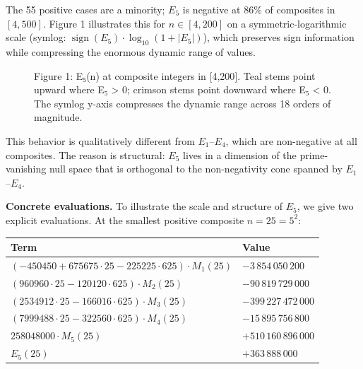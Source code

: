 \documentclass[
  11pt,
]{article}
\makeatletter
\newcounter{none} %
\newcommand*\pandocbounded[1]{%
  \sbox\pandoc@box{#1}%
  \Gscale@div\@tempa{\textheight}{\dimexpr\ht\pandoc@box+\dp\pandoc@box\relax}%
  \Gscale@div\@tempb{\linewidth}{\wd\pandoc@box}%
  \ifdim\@tempb\p@<\@tempa\p@\let\@tempa\@tempb\fi%
  \ifdim\@tempa\p@<\p@\scalebox{\@tempa}{\usebox\pandoc@box}%
  \else\usebox{\pandoc@box}%
  \fi%
}
\makeatother
\begin{document}
The 55 positive cases are a minority; \(E_5\) is negative at 86\% of
composites in \([4,500]\). Figure 1 illustrates this for
\(n \in [4,200]\) on a symmetric-logarithmic scale (symlog:
\(\operatorname{sign}(E_5)\cdot\log_{10}(1+|E_5|)\)), which preserves
sign information while compressing the enormous dynamic range of values.

\begin{figure}
\centering
\pandocbounded{\includegraphics[keepaspectratio,alt={Figure 1: E₅(n) at composite integers in {[}4,200{]}. Teal stems point upward where E₅ \textgreater{} 0; crimson stems point downward where E₅ \textless{} 0. The symlog y-axis compresses the dynamic range across 18 orders of magnitude.}]{e5_scatter.png}}
\caption{Figure 1: E₅(n) at composite integers in {[}4,200{]}. Teal
stems point upward where E₅ \textgreater{} 0; crimson stems point
downward where E₅ \textless{} 0. The symlog y-axis compresses the
dynamic range across 18 orders of magnitude.}
\end{figure}

This behavior is qualitatively different from \(E_1\)--\(E_4\), which
are non-negative at all composites. The reason is structural: \(E_5\)
lives in a dimension of the prime-vanishing null space that is
orthogonal to the non-negativity cone spanned by \(E_1\)--\(E_4\).

\textbf{Concrete evaluations.} To illustrate the scale and structure of
\(E_5\), we give two explicit evaluations. At the smallest positive
composite \(n = 25 = 5^2\):

{\def\LTcaptype{none} %
\begin{longtable}[]{@{}
  >{\raggedright\arraybackslash}p{}
  >{\raggedright\arraybackslash}p{}@{}}
\toprule\noalign{}
\begin{minipage}[b]{\linewidth}\raggedright
Term
\end{minipage} & \begin{minipage}[b]{\linewidth}\raggedright
Value
\end{minipage} \\
\midrule\noalign{}
\endhead
\bottomrule\noalign{}
\endlastfoot
\((-450450 + 675675 \cdot 25 - 225225 \cdot 625) \cdot M_1(25)\) &
\(-3\,854\,050\,200\) \\
\((960960 \cdot 25 - 120120 \cdot 625) \cdot M_2(25)\) &
\(-90\,819\,729\,000\) \\
\((2534912 \cdot 25 - 166016 \cdot 625) \cdot M_3(25)\) &
\(-399\,227\,472\,000\) \\
\((7999488 \cdot 25 - 322560 \cdot 625) \cdot M_4(25)\) &
\(-15\,895\,756\,800\) \\
\(258048000 \cdot M_5(25)\) & \(+510\,160\,896\,000\) \\
\textbf{\(E_5(25)\)} & \textbf{\(+363\,888\,000\)} \\
\end{longtable}
}
\end{document}
